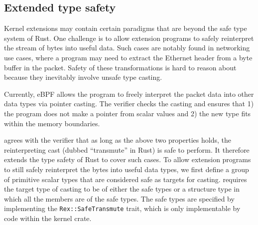 \subsection{Extended type safety}
Kernel extensions may contain certain paradigms that are beyond the safe
    type system of Rust.
One challenge is to allow extension programs to safely reinterpret the stream
    of bytes into useful data.
Such cases are notably found in networking use cases, where a program may need
    to extract the Ethernet header from a byte buffer in the packet.
Safety of these transformations is hard to reason about because they
    inevitably involve unsafe type casting.

Currently, eBPF allows the program to freely interpret the packet data into
    other data types via pointer casting.
The verifier checks the casting and ensures that 1) the program does not make a
    pointer from scalar values and 2) the new type fits within the memory
    boundaries.

\projname{} agrees with the verifier that as long as the above two properties
    holds, the reinterpreting cast (dubbed ``transmute'' in Rust) is safe to
    perform.
It therefore extends the type safety of Rust to cover such cases.
To allow extension programs to still safely reinterpret the bytes into useful
    data types, we first define a group of primitive scalar types that are
    considered safe as targets for casting.
\projname{} requires the target type of casting to be of either the safe types
    or a structure type in which all the members are of the safe types.
The safe types are specified by implementing the \texttt{Rex::SafeTransmute}
    trait, which is only implementable by code within the kernel crate.

